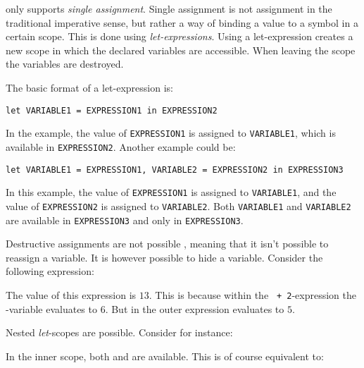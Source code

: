 \productname{} only supports \emph{single assignment}. Single assignment is not assignment
in the traditional imperative sense, but rather a way of binding a value to a symbol in a
certain scope. This is done using \emph{let-expressions}. Using a let-expression creates a
new scope in which the declared variables are accessible. When leaving the scope the
variables are destroyed.

The basic format of a let-expression is:

\texttt{let VARIABLE1 = EXPRESSION1 in EXPRESSION2}

In the example, the value of \texttt{EXPRESSION1} is assigned to \texttt{VARIABLE1}, which
is available in \texttt{EXPRESSION2}. Another example could be:

\texttt{let VARIABLE1 = EXPRESSION1, VARIABLE2 = EXPRESSION2 in EXPRESSION3}

In this example, the value of \texttt{EXPRESSION1} is assigned to \texttt{VARIABLE1}, and
the value of \texttt{EXPRESSION2} is assigned to \texttt{VARIABLE2}. Both \texttt{VARIABLE1}
and \texttt{VARIABLE2} are available in \texttt{EXPRESSION3} and only in \texttt{EXPRESSION3}.

Destructive assignments are not possible \productname{}, meaning that it isn't possible to 
reassign a variable. It is however possible to hide a variable.
Consider the following expression:


The value of this expression is $13$. This is because within the \texttt{ + 2}-expression
the -variable evaluates to $6$. But in the outer expression  evaluates to
$5$.

Nested \emph{let}-scopes are possible. Consider for instance:


In the inner scope, both  and  are available. This is of course equivalent
to:



